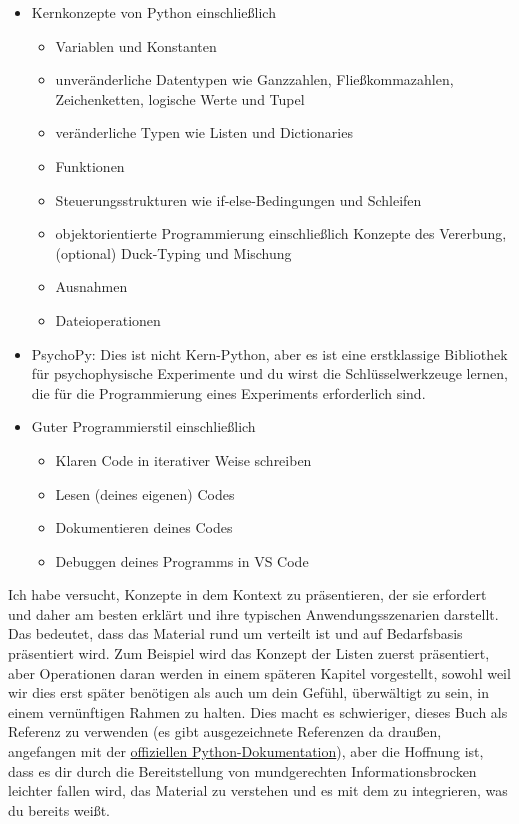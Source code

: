 \documentclass[
]{book}
\providecommand{\tightlist}{%
  \setlength{\itemsep}{0pt}\setlength{\parskip}{0pt}}
\begin{document}
\begin{itemize}
\tightlist
\item
  Kernkonzepte von Python einschließlich

  \begin{itemize}
  \tightlist
  \item
    Variablen und Konstanten
  \item
    unveränderliche Datentypen wie Ganzzahlen, Fließkommazahlen, Zeichenketten, logische Werte und Tupel
  \item
    veränderliche Typen wie Listen und Dictionaries
  \item
    Funktionen
  \item
    Steuerungsstrukturen wie if-else-Bedingungen und Schleifen
  \item
    objektorientierte Programmierung einschließlich Konzepte des Vererbung, (optional) Duck-Typing und Mischung
  \item
    Ausnahmen
  \item
    Dateioperationen
  \end{itemize}
\item
  PsychoPy: Dies ist nicht Kern-Python, aber es ist eine erstklassige Bibliothek für psychophysische Experimente und du wirst die Schlüsselwerkzeuge lernen, die für die Programmierung eines Experiments erforderlich sind.
\item
  Guter Programmierstil einschließlich

  \begin{itemize}
  \tightlist
  \item
    Klaren Code in iterativer Weise schreiben
  \item
    Lesen (deines eigenen) Codes
  \item
    Dokumentieren deines Codes
  \item
    Debuggen deines Programms in VS Code
  \end{itemize}
\end{itemize}

Ich habe versucht, Konzepte in dem Kontext zu präsentieren, der sie erfordert und daher am besten erklärt und ihre typischen Anwendungsszenarien darstellt. Das bedeutet, dass das Material rund um verteilt ist und auf Bedarfsbasis präsentiert wird. Zum Beispiel wird das Konzept der Listen zuerst präsentiert, aber Operationen daran werden in einem späteren Kapitel vorgestellt, sowohl weil wir dies erst später benötigen als auch um dein Gefühl, überwältigt zu sein, in einem vernünftigen Rahmen zu halten. Dies macht es schwieriger, dieses Buch als Referenz zu verwenden (es gibt ausgezeichnete Referenzen da draußen, angefangen mit der \href{https://docs.python.org/3/}{offiziellen Python-Dokumentation}), aber die Hoffnung ist, dass es dir durch die Bereitstellung von mundgerechten Informationsbrocken leichter fallen wird, das Material zu verstehen und es mit dem zu integrieren, was du bereits weißt.
\end{document}
